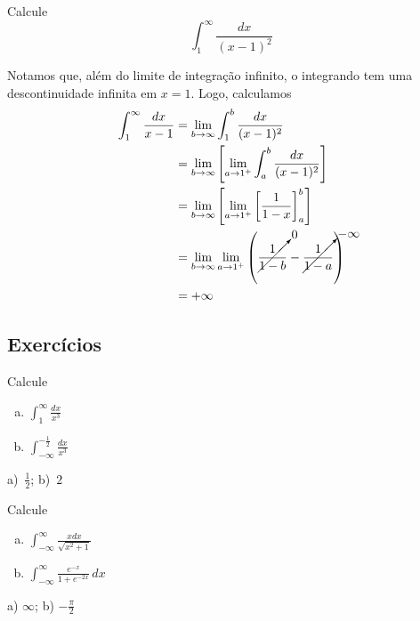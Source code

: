 \begin{exeresol}
  Calcule
  \begin{equation}
    \int_1^\infty\frac{dx}{(x-1)^2}
  \end{equation}
\end{exeresol}
\begin{resol}
  Notamos que, além do limite de integração infinito, o integrando tem uma descontinuidade infinita em $x=1$. Logo, calculamos
  \begin{align}
    \int_1^\infty\frac{dx}{x-1} &= \lim_{b\to\infty}\int_1^b\frac{dx}{(x-1)^2}\\
                                &= \lim_{b\to\infty}\left[\lim_{a\to 1^+}\int_a^b\frac{dx}{(x-1)^2}\right]\\
                                &= \lim_{b\to\infty}\left[\lim_{a\to 1^+}\left[\frac{1}{1-x}\right]_a^b\right]\\
                                &= \lim_{b\to\infty}\lim_{a\to 1^+}\left(\cancelto{0}{\frac{1}{1-b}} - \cancelto{-\infty}{\frac{1}{1-a}}\right)\\
                                &= +\infty
  \end{align}
\end{resol}

\subsection{Exercícios}

\begin{exer}
  Calcule
  \begin{enumerate}[a)]
  \item $\displaystyle\int_1^\infty\frac{dx}{x^3}$
  \item $\displaystyle\int_{-\infty}^{-\frac{1}{2}}\frac{dx}{x^3}$
  \end{enumerate}
\end{exer}
\begin{resp}
  a)~$\frac{1}{2}$; b)~$2$
\end{resp}

\begin{exer}
  Calcule
  \begin{enumerate}[a)]
  \item $\displaystyle\int_{-\infty}^\infty\frac{xdx}{\sqrt{x^2+1}}$
  \item $\displaystyle\int_{-\infty}^{\infty}\frac{e^{-x}}{1+e^{-2x}}\,dx$
  \end{enumerate}  
\end{exer}
\begin{resp}
  a) $\infty$; b) $-\frac{\pi}{2}$
\end{resp}


